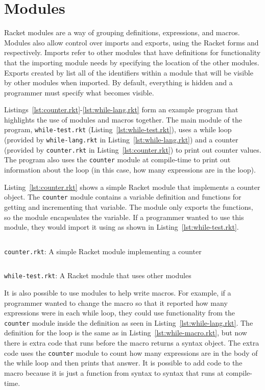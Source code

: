 \section{Modules}
Racket modules are a way of grouping definitions, expressions, and macros. 
Modules also allow control over imports and exports, using the Racket forms  and  respectively.
Imports refer to other modules that have definitions for functionality that the importing module needs by specifying the location of the other modules.
Exports created by  list all of the identifiers within a module that will be visible by other modules when imported. 
By default, everything is hidden and a programmer must specify what becomes visible.

Listings~\ref{lst:counter.rkt}-\ref{lst:while-lang.rkt} form an example program that highlights the use of modules and macros together.
The main module of the program, \texttt{while-test.rkt} (Listing~\ref{lst:while-test.rkt}), uses a while loop (provided by \texttt{while-lang.rkt} in Listing~\ref{lst:while-lang.rkt}) and a counter (provided by \texttt{counter.rkt} in Listing~\ref{lst:counter.rkt}) to print out counter values.
The program also uses the \texttt{counter} module at compile-time to print out information about the  loop (in this case, how many expressions are in the  loop).

Listing~\ref{lst:counter.rkt} shows a simple Racket module that implements a counter object.
The \texttt{counter} module contains a variable definition and functions for getting and incrementing that variable.
The module only exports the functions, so the module encapsulates the variable.
If a programmer wanted to use this module, they would import it using  as shown in Listing~\ref{lst:while-test.rkt}. 
\begin{listing}[tb]
  \inputminted{racket}{listings/counter.rkt}
  \caption{\texttt{counter.rkt}: A simple Racket module implementing a counter}
  \label{lst:counter.rkt}
\end{listing}

\begin{listing}[tb]
  \inputminted{racket}{listings/while-test.rkt}
  \caption{\texttt{while-test.rkt}: A Racket module that uses other modules}
  \label{lst:while-test.rkt}
\end{listing}

It is also possible to use modules to help write macros.
For example, if a programmer wanted to change the  macro so that it reported how many expressions were in each while loop, they could use functionality from the \texttt{counter} module inside the  definition as seen in Listing~\ref{lst:while-lang.rkt}.
The definition for the  loop is the same as in Listing~\ref{lst:while-macro.rkt}, but now there is extra code that runs before the macro returns a syntax object.
The extra code uses the \texttt{counter} module to count how many expressions are in the body of the while loop and then prints that answer.
It is possible to add code to the  macro because it is just a function from syntax to syntax that runs at compile-time. 


